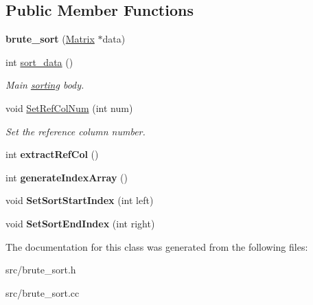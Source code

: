\subsection*{Public Member Functions}
\begin{DoxyCompactItemize}
\item 
\hypertarget{classbrute__sort_a2dbbb3b1c89d6a5720d79a5bf150ad1f}{
{\bfseries brute\_\-sort} (\hyperlink{classMatrix}{Matrix} $\ast$data)}
\label{d3/d39/classbrute__sort_a2dbbb3b1c89d6a5720d79a5bf150ad1f}

\item 
\hypertarget{classbrute__sort_a377b8811e92553a66cdb6780c43e16e6}{
int \hyperlink{classbrute__sort_a377b8811e92553a66cdb6780c43e16e6}{sort\_\-data} ()}
\label{d3/d39/classbrute__sort_a377b8811e92553a66cdb6780c43e16e6}

\begin{DoxyCompactList}\small\item\em Main \hyperlink{classsorting}{sorting} body. \item\end{DoxyCompactList}\item 
\hypertarget{classbrute__sort_a7d43275af73d67695f2736dcada07b86}{
void \hyperlink{classbrute__sort_a7d43275af73d67695f2736dcada07b86}{SetRefColNum} (int num)}
\label{d3/d39/classbrute__sort_a7d43275af73d67695f2736dcada07b86}

\begin{DoxyCompactList}\small\item\em Set the reference column number. \item\end{DoxyCompactList}\item 
\hypertarget{classbrute__sort_a548e41cbd5295cef67b18e4d88751ca7}{
int {\bfseries extractRefCol} ()}
\label{d3/d39/classbrute__sort_a548e41cbd5295cef67b18e4d88751ca7}

\item 
\hypertarget{classbrute__sort_ac430d83982bdd362c5e870b56b70eccb}{
int {\bfseries generateIndexArray} ()}
\label{d3/d39/classbrute__sort_ac430d83982bdd362c5e870b56b70eccb}

\item 
\hypertarget{classbrute__sort_a4e18e2ae0ca7c37d657a1447060992ab}{
void {\bfseries SetSortStartIndex} (int left)}
\label{d3/d39/classbrute__sort_a4e18e2ae0ca7c37d657a1447060992ab}

\item 
\hypertarget{classbrute__sort_a7fc765a30ed771ca56ecbc782076b0dc}{
void {\bfseries SetSortEndIndex} (int right)}
\label{d3/d39/classbrute__sort_a7fc765a30ed771ca56ecbc782076b0dc}

\end{DoxyCompactItemize}


The documentation for this class was generated from the following files:\begin{DoxyCompactItemize}
\item 
src/brute\_\-sort.h\item 
src/brute\_\-sort.cc\end{DoxyCompactItemize}
